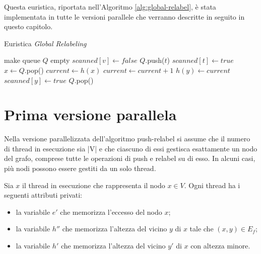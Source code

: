         Questa euristica, riportata nell'Algoritmo \ref{alg:global-relabel}, è stata implementata in tutte le versioni parallele che verranno descritte in seguito in questo capitolo.

        \begin{algorithm}
            \caption{Euristica \textit{Global Relabeling}}\label{alg:global-relabel}
            \begin{algorithmic}
                \State make queue $Q$ empty 
                    \State $scanned[v] \gets false$
                \EndFor
                \State $Q.$push($t$)
                \State $scanned[t] \gets true$
                    \State $x \gets Q.$pop()
                    \State $current \gets h(x)$
                    \State $current \gets current + 1$
                        \State $h(y) \gets current$
                        \State $scanned[y] \gets true$
                        \State $Q.$pop()
                    \EndFor     
                \EndWhile
            \end{algorithmic}
        \end{algorithm}


    \section{Prima versione parallela}

        Nella versione parallelizzata dell'algoritmo push-relabel si assume che il numero di thread in esecuzione sia |V| e che ciascuno di essi gestisca esattamente un nodo del grafo, comprese tutte le operazioni di push e relabel su di esso. In alcuni casi, più nodi possono essere gestiti da un solo thread.

        Sia $x$ il thread in esecuzione che rappresenta il nodo $x \in V$. Ogni thread ha i seguenti attributi privati: 
        \begin{itemize}
        \item la variabile $e'$ che memorizza l'eccesso del nodo $x$;
        \item la variabile $h''$ che memorizza l'altezza del vicino $y$ di $x$ tale che $(x, y) \in E_f$;
        \item la variabile $h'$ che memorizza l'altezza del vicino $y'$ di $x$ con altezza minore.
        \end{itemize}
        
